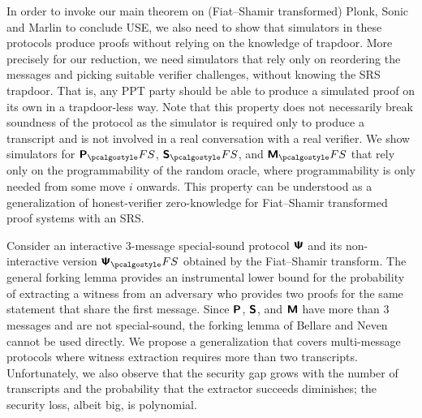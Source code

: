   In order to invoke our main theorem
on (Fiat--Shamir transformed) Plonk, Sonic and Marlin to conclude USE, we also need
to show that simulators in these protocols produce proofs without relying on the
knowledge of trapdoor. More precisely for our reduction, we need simulators that rely
only on reordering the messages and picking suitable verifier challenges, without
knowing the SRS trapdoor.  That is, any PPT party should be able to produce a
simulated proof on its own in a trapdoor-less way. Note that this property does not
necessarily break soundness of the protocol as the simulator is required only to
produce a transcript and is not involved in a real conversation with a real
verifier. We show simulators for $\plonkprotfs$, $\sonicprotfs$, and $\marlinprotfs$
that rely only on the programmability of the random oracle, where programmability is only needed
from some move $i$ onwards. This property can be understood as a generalization of
honest-verifier zero-knowledge for Fiat--Shamir transformed proof systems with an
SRS.

  Consider an interactive $3$-message
special-sound protocol $\bm{\mathsf{\Psi}}$ and its non-interactive version $\ps_\fs$ obtained by the
Fiat--Shamir transform. The general forking lemma provides an instrumental lower bound for the
probability of extracting a witness from an adversary who provides two proofs for the same
statement that share the first message. Since $\bm{\mathsf{P}}$, $\bm{\mathsf{S}}$, and $\bm{\mathsf{M}}$ have more than $3$
messages and are not special-sound, the forking lemma of Bellare and Neven~\cite{CCS:BelNev06}
cannot be used directly. We propose a generalization that covers multi-message protocols where
witness extraction requires more than two transcripts.  Unfortunately, we also observe
that the security gap grows with the number of transcripts and the probability that the
extractor succeeds diminishes; the security loss, albeit big, is polynomial.

